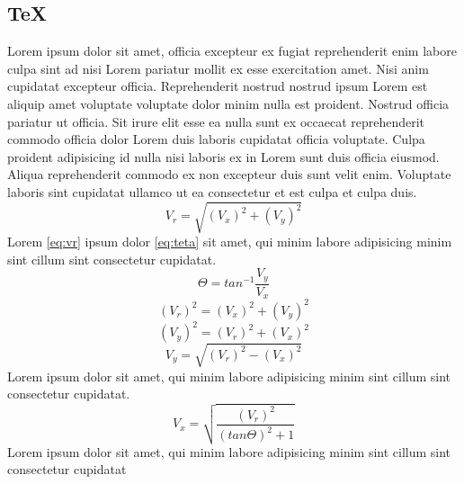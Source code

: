 \subsection{\TeX}
Lorem ipsum dolor sit amet, officia excepteur ex fugiat reprehenderit enim labore culpa sint ad nisi Lorem pariatur mollit ex esse exercitation amet. Nisi anim cupidatat excepteur officia. Reprehenderit nostrud nostrud ipsum Lorem est aliquip amet voluptate voluptate dolor minim nulla est proident. Nostrud officia pariatur ut officia. Sit irure elit esse ea nulla sunt ex occaecat reprehenderit commodo officia dolor Lorem duis laboris cupidatat officia voluptate. Culpa proident adipisicing id nulla nisi laboris ex in Lorem sunt duis officia eiusmod. Aliqua reprehenderit commodo ex non excepteur duis sunt velit enim. Voluptate laboris sint cupidatat ullamco ut ea consectetur et est culpa et culpa duis.
\begin{equation}
	V_{r} = \sqrt{(V_{x})^{2}+(V_{y})^{2}}
	\label{eq:vr}
\end{equation}
Lorem \ref{eq:vr} ipsum dolor \ref{eq:teta} sit amet, qui minim labore adipisicing minim sint cillum sint consectetur cupidatat.
\begin{equation}
	\Theta = tan^{-1}\frac{V_{y}}{V_{x}}
	\label{eq:teta}
\end{equation}
\begin{equation}
	(V_{r})^{2} = (V_{x})^{2}+(V_{y})^{2}
	\label{eq:vr2}
\end{equation}
\begin{equation}
	(V_{y})^{2} = (V_{r})^{2}+(V_{x})^{2}
	\label{eq:vy}
\end{equation}
\begin{equation}
	V_{y} = \sqrt{(V_{r})^{2}-(V_{x})^{2}}
	\label{eq:vy2}
\end{equation}
Lorem ipsum dolor sit amet, qui minim labore adipisicing minim sint cillum sint consectetur cupidatat.
\begin{equation}
	V_{x} = \sqrt{\frac{(V_{r})^{2}}{(tan\Theta)^{2}+1}}
	\label{eq:vx2}
\end{equation}
Lorem ipsum dolor sit amet, qui minim labore adipisicing minim sint cillum sint consectetur cupidatat
